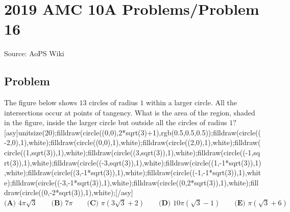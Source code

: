 \documentclass[12pt]{article}
\begin{document}
\section*{{2019 AMC 10A Problems/Problem 16}}
Source: AoPS Wiki

\subsection*{Problem}
The figure below shows $13$ circles of radius $1$ within a larger circle. All the intersections occur at points of tangency. What is the area of the region, shaded in the figure, inside the larger circle but outside all the circles of radius $1 ?$ [asy]unitsize(20);filldraw(circle((0,0),2*sqrt(3)+1),rgb(0.5,0.5,0.5));filldraw(circle((-2,0),1),white);filldraw(circle((0,0),1),white);filldraw(circle((2,0),1),white);filldraw(circle((1,sqrt(3)),1),white);filldraw(circle((3,sqrt(3)),1),white);filldraw(circle((-1,sqrt(3)),1),white);filldraw(circle((-3,sqrt(3)),1),white);filldraw(circle((1,-1*sqrt(3)),1),white);filldraw(circle((3,-1*sqrt(3)),1),white);filldraw(circle((-1,-1*sqrt(3)),1),white);filldraw(circle((-3,-1*sqrt(3)),1),white);filldraw(circle((0,2*sqrt(3)),1),white);filldraw(circle((0,-2*sqrt(3)),1),white);[/asy] $\textbf{(A) } 4 \pi \sqrt{3} \qquad\textbf{(B) } 7 \pi \qquad\textbf{(C) } \pi\left(3\sqrt{3} +2\right) \qquad\textbf{(D) } 10 \pi \left(\sqrt{3} - 1\right) \qquad\textbf{(E) } \pi\left(\sqrt{3} + 6\right)$
\end{document}
